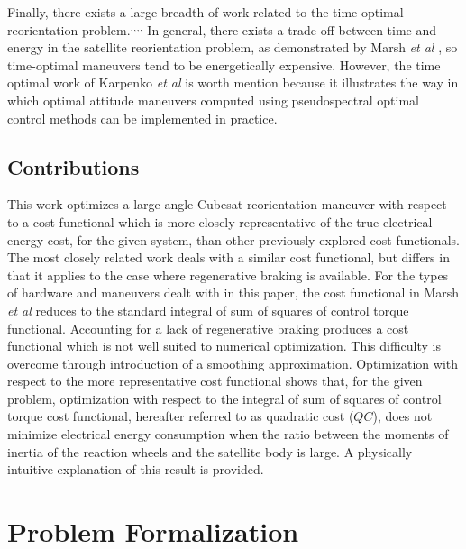 \documentclass[letterpaper, paper,11pt]{AAS}
\begin{document}
Finally, there exists a large breadth of work related to the time optimal reorientation problem.\cite{Shen1998}$^,$\cite{Bilimoria1993}$^,$\cite{Melton2014}$^,$\cite{Fleming2009}$^,$\cite{Fleming2004} In general, there exists a trade-off between time and energy in the satellite reorientation problem, as demonstrated by Marsh \textit{et al} \cite{Marsh2015}, so time-optimal maneuvers tend to be energetically expensive. However, the time optimal work of Karpenko \textit{et al} \cite{Karpenko2014} is worth mention because it illustrates the way in which optimal attitude maneuvers computed using pseudospectral optimal control methods can be implemented in practice.

\subsection{Contributions}
This work optimizes a large angle Cubesat reorientation maneuver with respect to a cost functional which is more closely representative of the true electrical energy cost, for the given system, than other previously explored cost functionals. The most closely related work deals with a similar cost functional, but differs in that it applies to the case where regenerative braking is available.\cite{Marsh2015} For the types of hardware and maneuvers dealt with in this paper, the cost functional in Marsh \textit{et al} \cite{Marsh2015} reduces to the standard integral of sum of squares of control torque functional. Accounting for a lack of regenerative braking produces a cost functional which is not well suited to numerical optimization. This difficulty is overcome through introduction of a smoothing approximation. Optimization with respect to the more representative cost functional shows that, for the given problem, optimization with respect to the integral of sum of squares of control torque cost functional, hereafter referred to as quadratic cost ($QC$), does not minimize electrical energy consumption when the ratio between the moments of inertia of the reaction wheels and the satellite body is large. A physically intuitive explanation of this result is provided. 

\section{Problem Formalization}
\label{sec:PF}
\end{document}

